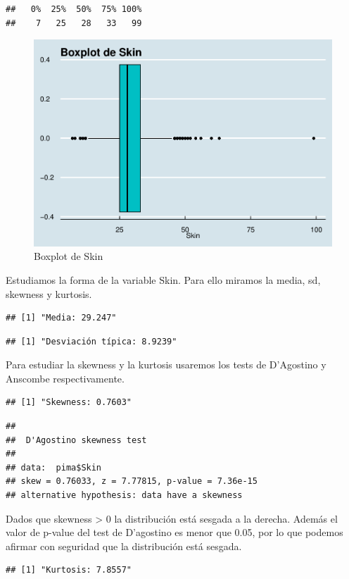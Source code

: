 \documentclass[
]{article}
\begin{document}
\begin{verbatim}
##   0%  25%  50%  75% 100% 
##    7   25   28   33   99
\end{verbatim}

\begin{figure}

{\centering \includegraphics[width=0.5\linewidth]{pima-clasificacion_files/figure-latex/box_skin-1} 

}

\caption{Boxplot de Skin}\label{fig:box_skin}
\end{figure}

Estudiamos la forma de la variable Skin. Para ello miramos la media, sd,
skewness y kurtosis.

\begin{verbatim}
## [1] "Media: 29.247"
\end{verbatim}

\begin{verbatim}
## [1] "Desviación típica: 8.9239"
\end{verbatim}

Para estudiar la skewness y la kurtosis usaremos los tests de D'Agostino
y Anscombe respectivamente.

\begin{verbatim}
## [1] "Skewness: 0.7603"
\end{verbatim}

\begin{verbatim}
## 
##  D'Agostino skewness test
## 
## data:  pima$Skin
## skew = 0.76033, z = 7.77815, p-value = 7.36e-15
## alternative hypothesis: data have a skewness
\end{verbatim}

Dados que skewness \textgreater{} 0 la distribución está sesgada a la
derecha. Además el valor de p-value del test de D'agostino es menor que
0.05, por lo que podemos afirmar con seguridad que la distribución está
sesgada.

\begin{verbatim}
## [1] "Kurtosis: 7.8557"
\end{verbatim}
\end{document}
